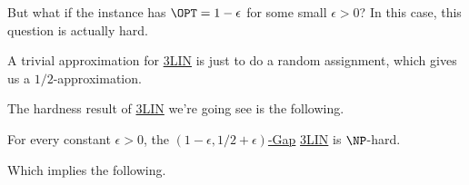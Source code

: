 But what if the instance has \(\OPT = 1 - \epsilon \) for some small \(\epsilon > 0\)? In this case, this question is actually hard.

\begin{remark}
	A trivial approximation for \hyperref[prb:max-3LIN]{3LIN} is just to do a random assignment, which gives us a \(1 / 2\)-approximation.
\end{remark}

The hardness result of \hyperref[prb:max-3LIN]{3LIN} we're going see is the following.

\begin{theorem}[\cite{10.1145/258533.258536}]\label{thm:3LIN}
	For every constant \(\epsilon >0\), the \hyperref[def:c-s-Gap]{\((1 - \epsilon , 1 / 2 + \epsilon )\)-Gap} \hyperref[prb:max-3LIN]{3LIN} is \(\NP\)-hard.
\end{theorem}

Which implies the following.

